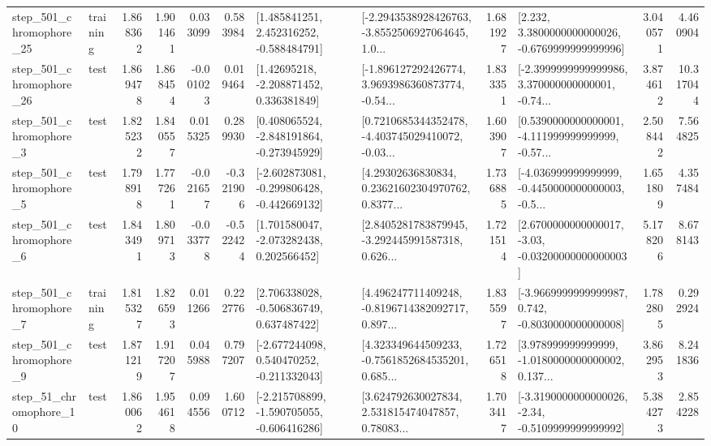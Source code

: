 \begin{tabular}{llrrrrllrlrr}
  step\_501\_chromophore\_25 &  training &      1.868362 &    1.901461 &      0.033099 &  0.583984 &    [1.485841251, 2.452316252, -0.588484791] &  [-2.2943538928426763, -3.8552506927064645, 1.0... &       1.681927 &   [2.232, 3.3800000000000026, -0.6769999999999996] &            3.040571 &          4.460904 \\
  step\_501\_chromophore\_26 &      test &      1.869478 &    1.868454 &     -0.001023 &  0.019464 &     [1.42695218, -2.208871452, 0.336381849] &  [-1.896127292426774, 3.9693986360873774, -0.54... &       1.833351 &  [-2.3999999999999986, 3.370000000000001, -0.74... &            3.874612 &         10.317044 \\
   step\_501\_chromophore\_3 &      test &      1.825232 &    1.840557 &      0.015325 &  0.289930 &   [0.408065524, -2.848191864, -0.273945929] &  [0.7210685344352478, -4.403745029410072, -0.03... &       1.603907 &  [0.5390000000000001, -4.111999999999999, -0.57... &            2.508442 &          7.564825 \\
   step\_501\_chromophore\_5 &      test &      1.798918 &    1.777261 &     -0.021657 & -0.321906 &  [-2.602873081, -0.299806428, -0.442669132] &  [4.29302636830834, 0.23621602304970762, 0.8377... &       1.736885 &  [-4.036999999999999, -0.4450000000000003, -0.5... &            1.651809 &          4.357484 \\
   step\_501\_chromophore\_6 &      test &      1.843491 &    1.809713 &     -0.033778 & -0.522424 &    [1.701580047, -2.073282438, 0.202566452] &  [2.8405281783879945, -3.292445991587318, 0.626... &       1.721514 &  [2.6700000000000017, -3.03, -0.03200000000000003] &            5.178206 &          8.678143 \\
   step\_501\_chromophore\_7 &  training &      1.815327 &    1.826593 &      0.011266 &  0.222776 &    [2.706338028, -0.506836749, 0.637487422] &  [4.496247711409248, -0.8196714382092717, 0.897... &       1.835597 &  [-3.9669999999999987, 0.742, -0.8030000000000008] &            1.782805 &          0.292924 \\
   step\_501\_chromophore\_9 &      test &      1.871219 &    1.917207 &      0.045988 &  0.797207 &   [-2.677244098, 0.540470252, -0.211332043] &  [4.323349644509233, -0.7561852684535201, 0.685... &       1.726518 &  [3.978999999999999, -1.0180000000000002, 0.137... &            3.862953 &          8.241836 \\
   step\_51\_chromophore\_10 &      test &      1.860062 &    1.954618 &      0.094556 &  1.600712 &  [-2.215708899, -1.590705055, -0.606416286] &  [3.624792630027834, 2.531815474047857, 0.78083... &       1.703417 &  [-3.3190000000000026, -2.34, -0.5109999999999992] &            5.384273 &          2.854228 \\

\end{tabular}
